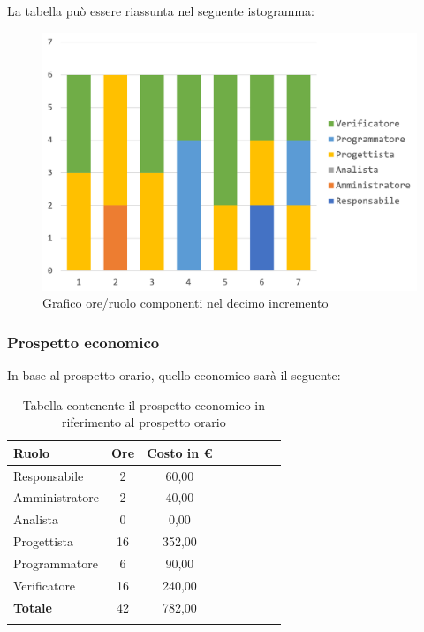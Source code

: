 		La tabella può essere riassunta nel seguente istogramma:
		\begin{figure}[H]
			\centering
			\includegraphics[width=0.8\linewidth]{./images/preventivo/incremento10-1.png}
			\caption{Grafico ore/ruolo componenti nel decimo incremento}
			\label{fig:grafico suddivione ruoli incremento X}
		\end{figure}
		
		\subsubsection{Prospetto economico}
		In base al prospetto orario, quello economico sarà il seguente: 
		
		\begin{longtable}{|l|c|c|c|c|c|c|c|}
			\hline
			\rowcolor{lighter-grayer}
			\textbf{Ruolo} & \textbf{Ore} & \textbf{Costo in € } \\
			\hline
			\endfirsthead
			
			\hline
			Responsabile 	    & 2 & 60,00\\
			\hline 
			\hline
			Amministratore	   & 2 & 40,00\\
			\hline
			\hline
			Analista 				& 0 & 0,00\\
			\hline
			\hline
			Progettista 		   & 16 & 352,00\\
			\hline
			\hline
			Programmatore 	  & 6 & 90,00\\
			\hline
			\hline
			Verificatore 		   & 16 & 240,00\\
			\hline
			\textbf{Totale} 	 & 42 & 782,00\\
			\hline
			\caption{Tabella contenente il prospetto economico in riferimento al prospetto orario}
		\end{longtable}
		\pagebreak
		
